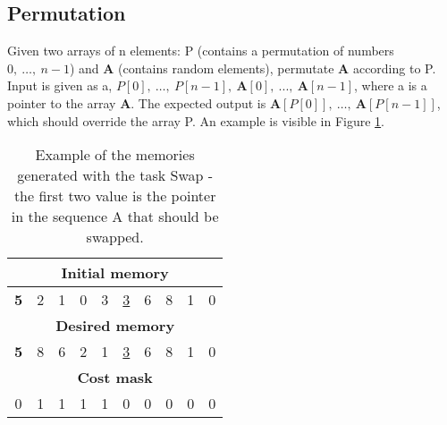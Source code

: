 \subsection{Permutation}
Given two arrays of n elements: P (contains a permutation of numbers $0,\ \dots,\ n-1$) and \textbf{A} (contains random elements), permutate \textbf{A} according to P. Input is given as a, $P[0],\ \dots,\ P[n-1],\ \textbf{A}[0],\ ...,\ \textbf{A}[n-1]$, where a is a pointer to the array \textbf{A}. The expected output is $\textbf{A}[P[0]],\ \dots,\ \textbf{A}[P[n-1]]$, which should override the array P. An example is visible in Figure \ref{fig:permutation-example}.
\begin{table}[h!]
	\centering
	\begin{tabular}{|c|c|c|c|c|c|c|c|c|c|}
		\hline
		\multicolumn{10}{|c|}{\textbf{Initial memory}} \\ \hline
		\textbf{5} & 2 & 1 & 0 & 3 & \underline{3} & 6 & 8 & 1 & 0 \\ \hline\hline\hline
		\multicolumn{10}{|c|}{\textbf{Desired memory}} \\ \hline
		\textbf{5} & 8 & 6 & 2 & 1 & \underline{3} & 6 & 8 & 1 & 0 \\ \hline\hline\hline
		\multicolumn{10}{|c|}{\textbf{Cost mask}} \\ \hline
		0 & 1 & 1 & 1 & 1 & 0 & 0 & 0 & 0 & 0 \\ \hline
	\end{tabular}
	\caption{Example of the memories generated with the task Swap - the first two value is the pointer in the sequence A that should be swapped.}
	\label{fig:permutation-example}
\end{table}
\FloatBarrier

